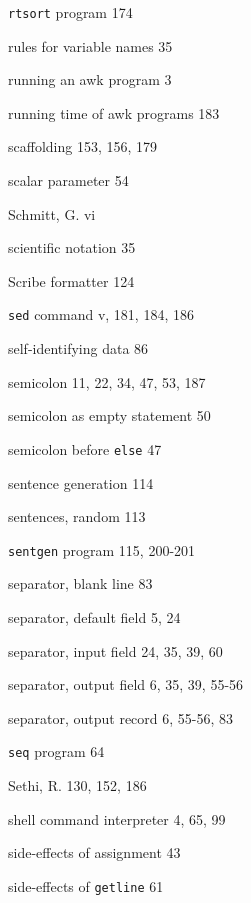 \begin{multicols}{3}
\hangindent=4pc  \verb'rtsort' program 174

\hangindent=4pc  rules for variable names 35

\hangindent=4pc  running an awk program 3

\hangindent=4pc  running time of awk programs 183

\hangindent=4pc  scaffolding 153, 156, 179

\hangindent=4pc  scalar parameter 54

\hangindent=4pc  Schmitt, G. vi

\hangindent=4pc  scientific notation 35

\hangindent=4pc  Scribe formatter 124

\hangindent=4pc  \verb'sed' command v, 181, 184, 186

\hangindent=4pc  self-identifying data 86

\hangindent=4pc  semicolon 11, 22, 34, 47, 53, 187

\hangindent=4pc  semicolon as empty statement 50

\hangindent=4pc  semicolon before \verb'else' 47

\hangindent=4pc  sentence generation 114

\hangindent=4pc  sentences, random 113

\hangindent=4pc  \verb'sentgen' program 115, 200-201

\hangindent=4pc  separator, blank line 83

\hangindent=4pc  separator, default field 5, 24

\hangindent=4pc  separator, input field 24, 35, 39, 60

\hangindent=4pc  separator, output field 6, 35, 39, 55-56

\hangindent=4pc  separator, output record 6, 55-56,  83

\hangindent=4pc  \verb'seq' program 64

\hangindent=4pc  Sethi, R. 130, 152, 186

\hangindent=4pc  shell command interpreter 4, 65, 99

\hangindent=4pc  side-effects of assignment 43

\hangindent=4pc  side-effects of \verb'getline' 61


\end{multicols}
